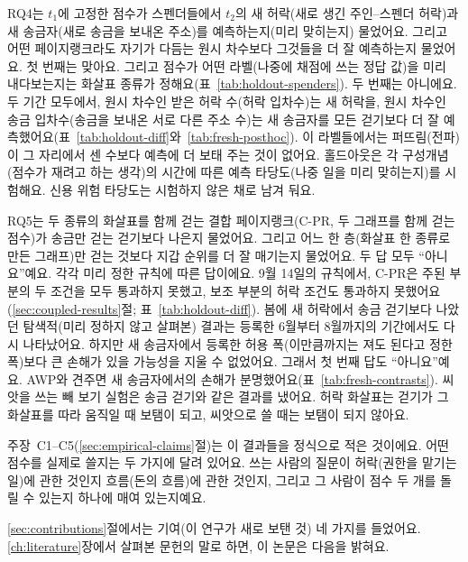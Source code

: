 RQ4는 $t_1$에 고정한 점수가 스펜더들에서 $t_2$의 새 허락(새로 생긴 주인--스펜더 허락)과 새 송금자(새로 송금을 보내온 주소)를 예측하는지(미리 맞히는지) 물었어요. 그리고 어떤 페이지랭크라도 자기가 다듬는 원시 차수보다 그것들을 더 잘 예측하는지 물었어요. 첫 번째는 맞아요. 그리고 점수가 어떤 라벨(나중에 채점에 쓰는 정답 값)을 미리 내다보는지는 화살표 종류가 정해요(표~\ref{tab:holdout-spenders}). 두 번째는 아니에요. 두 기간 모두에서, 원시 차수인 받은 허락 수(허락 입차수)는 새 허락을, 원시 차수인 송금 입차수(송금을 보내온 서로 다른 주소 수)는 새 송금자를 모든 걷기보다 더 잘 예측했어요(표~\ref{tab:holdout-diff}와~\ref{tab:fresh-posthoc}). 이 라벨들에서는 퍼뜨림(전파)이 그 자리에서 센 수보다 예측에 더 보태 주는 것이 없어요. 홀드아웃은 각 구성개념(점수가 재려고 하는 생각)의 시간에 따른 예측 타당도(나중 일을 미리 맞히는지)를 시험해요. 신용 위험 타당도는 시험하지 않은 채로 남겨 둬요.

RQ5는 두 종류의 화살표를 함께 걷는 결합 페이지랭크(C-PR, 두 그래프를 함께 걷는 점수)가 송금만 걷는 걷기보다 나은지 물었어요. 그리고 어느 한 층(화살표 한 종류로 만든 그래프)만 걷는 것보다 지갑 순위를 더 잘 매기는지 물었어요. 두 답 모두 “아니요”예요. 각각 미리 정한 규칙에 따른 답이에요. 9월 14일의 규칙에서, C-PR은 주된 부분의 두 조건을 모두 통과하지 못했고, 보조 부분의 허락 조건도 통과하지 못했어요(\ref{sec:coupled-results}절; 표~\ref{tab:holdout-diff}). 봄에 새 허락에서 송금 걷기보다 나았던 탐색적(미리 정하지 않고 살펴본) 결과는 등록한 6월부터 8월까지의 기간에서도 다시 나타났어요. 하지만 새 송금자에서 등록한 허용 폭(이만큼까지는 져도 된다고 정한 폭)보다 큰 손해가 있을 가능성을 지울 수 없었어요. 그래서 첫 번째 답도 “아니요”예요. AWP와 견주면 새 송금자에서의 손해가 분명했어요(표~\ref{tab:fresh-contrasts}). 씨앗을 쓰는 빼 보기 실험은 송금 걷기와 같은 결과를 냈어요. 허락 화살표는 걷기가 그 화살표를 따라 움직일 때 보탬이 되고, 씨앗으로 쓸 때는 보탬이 되지 않아요.

주장~C1--C5(\ref{sec:empirical-claims}절)는 이 결과들을 정식으로 적은 것이에요. 어떤 점수를 실제로 쓸지는 두 가지에 달려 있어요. 쓰는 사람의 질문이 허락(권한을 맡기는 일)에 관한 것인지 흐름(돈의 흐름)에 관한 것인지, 그리고 그 사람이 점수 두 개를 돌릴 수 있는지 하나에 매여 있는지예요.


\ref{sec:contributions}절에서는 기여(이 연구가 새로 보탠 것) 네 가지를 들었어요. \ref{ch:literature}장에서 살펴본 문헌의 말로 하면, 이 논문은 다음을 밝혀요.

